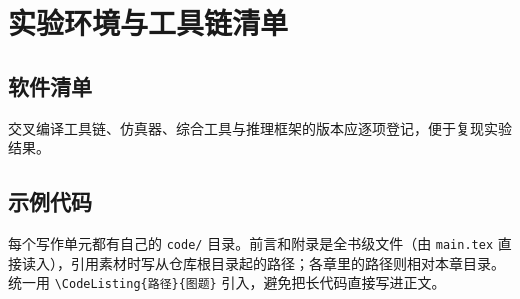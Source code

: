 \chapter{实验环境与工具链清单}
\label{app:toolchain}


\section{软件清单}
\label{sec:appendix-software}

交叉编译工具链、仿真器、综合工具与推理框架的版本应逐项登记，便于复现实验结果。

\section{示例代码}
\label{sec:appendix-code}

每个写作单元都有自己的 \texttt{code/} 目录。前言和附录是全书级文件（由 \texttt{main.tex}
直接读入），引用素材时写从仓库根目录起的路径；各章里的路径则相对本章目录。
统一用 \verb|\CodeListing{路径}{图题}| 引入，避免把长代码直接写进正文。

